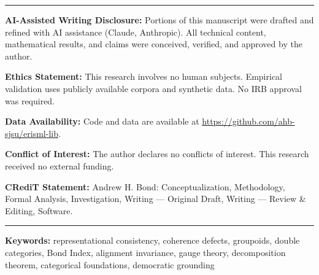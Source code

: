 \documentclass[12pt]{article}
\begin{document}
\begin{titlepage}
\begin{abstract}
A key result is the \textbf{Decomposition Theorem}: every coherence defect splits uniquely into a \emph{gauge-removable} part (eliminable by better canonicalization) and an \emph{intrinsic anomaly} (requiring specification changes). This separation distinguishes implementation bugs from specification contradictions.

When re-description transforms form a Lie group acting smoothly, the framework recovers classical gauge theory as a smooth limit; we state this correspondence as a conjecture with supporting evidence. We address specification grounding via stakeholder deliberation, demonstrate on an autonomous vehicle case study, and provide computational complexity analysis. The framework makes the Bond Index---a measurable, auditable, actionable metric---the primary engineering deliverable for deployment decisions about representational consistency.
\end{abstract}

\vfill

\noindent\rule{\linewidth}{0.4pt}
\small
\noindent\textbf{AI-Assisted Writing Disclosure:} Portions of this manuscript were drafted and refined with AI assistance (Claude, Anthropic). All technical content, mathematical results, and claims were conceived, verified, and approved by the author.

\noindent\textbf{Ethics Statement:} This research involves no human subjects. Empirical validation uses publicly available corpora and synthetic data. No IRB approval was required.

\noindent\textbf{Data Availability:} Code and data are available at \url{https://github.com/ahb-sjsu/erisml-lib}.

\noindent\textbf{Conflict of Interest:} The author declares no conflicts of interest. This research received no external funding.

\noindent\textbf{CRediT Statement:} Andrew H. Bond: Conceptualization, Methodology, Formal Analysis, Investigation, Writing --- Original Draft, Writing --- Review \& Editing, Software.
\noindent\rule{\linewidth}{0.4pt}
\normalsize

\end{titlepage}

\noindent\textbf{Keywords:} representational consistency, coherence defects, groupoids, double categories, Bond Index, alignment invariance, gauge theory, decomposition theorem, categorical foundations, democratic grounding

\end{document}
